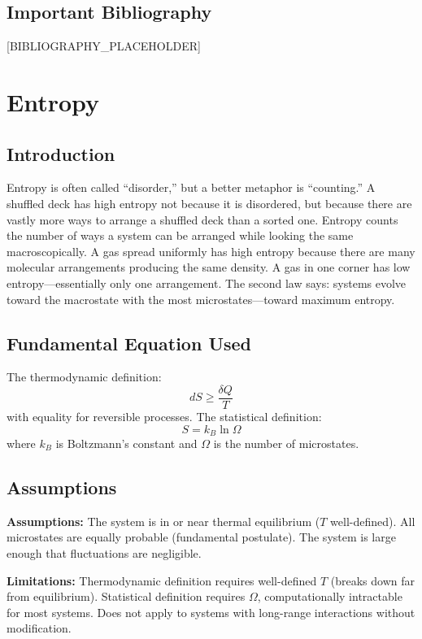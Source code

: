 \documentclass[11pt,openright]{book}
\begin{document}
\section*{Important Bibliography}

[BIBLIOGRAPHY_PLACEHOLDER]


\chapter{Entropy}

\section*{Introduction}

Entropy is often called ``disorder,'' but a better metaphor is ``counting.'' A shuffled deck has high entropy not because it is disordered, but because there are vastly more ways to arrange a shuffled deck than a sorted one. Entropy counts the number of ways a system can be arranged while looking the same macroscopically. A gas spread uniformly has high entropy because there are many molecular arrangements producing the same density. A gas in one corner has low entropy---essentially only one arrangement. The second law says: systems evolve toward the macrostate with the most microstates---toward maximum entropy.
\section*{Fundamental Equation Used}

The thermodynamic definition:
\[
dS \geq \frac{\delta Q}{T}
\]
with equality for reversible processes. The statistical definition:
\[
S = k_B \ln \Omega
\]
where $k_B$ is Boltzmann's constant and $\Omega$ is the number of microstates.
\section*{Assumptions}

\textbf{Assumptions:} The system is in or near thermal equilibrium ($T$ well-defined). All microstates are equally probable (fundamental postulate). The system is large enough that fluctuations are negligible.


\textbf{Limitations:} Thermodynamic definition requires well-defined $T$ (breaks down far from equilibrium). Statistical definition requires $\Omega$, computationally intractable for most systems. Does not apply to systems with long-range interactions without modification.
\end{document}
